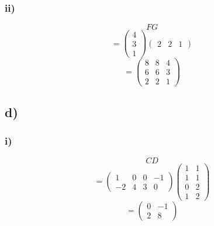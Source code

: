         \subsubsection{ii)}
            $$FG$$
            $$=\begin{pmatrix}
                4 \\
                3 \\
                1
            \end{pmatrix}
            \begin{pmatrix}
                2 & 2 & 1
            \end{pmatrix}
            $$
            $$=\begin{pmatrix}
                8 & 8 & 4\\
                6 & 6 & 3 \\
                2 & 2 & 1
            \end{pmatrix}$$

    \subsection{d)}
        \subsubsection{i)}
            $$CD$$
            $$=\begin{pmatrix}
                1 & 0 & 0 & -1\\
                -2 & 4 & 3 & 0
            \end{pmatrix}
            \begin{pmatrix}
                1 & 1\\
                1 & 1\\
                0 & 2\\
                1 & 2
            \end{pmatrix}$$
            $$=\begin{pmatrix}
                0 & -1 \\
                2 & 8
            \end{pmatrix}$$

